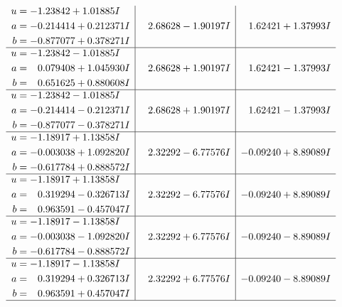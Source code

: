 \documentclass[1p]{elsarticle_modified}
\theoremstyle{definition}
\begin{document}
$$\begin{array}{c|c|c}
\begin{aligned}
u &= -1.23842 + 1.01885 I \\
a &= -0.214414 + 0.212371 I \\
b &= -0.877077 + 0.378271 I\end{aligned}
 & \phantom{-}2.68628 - 1.90197 I & \phantom{-}1.62421 + 1.37993 I \\ \hline\begin{aligned}
u &= -1.23842 - 1.01885 I \\
a &= \phantom{-}0.079408 + 1.045930 I \\
b &= \phantom{-}0.651625 + 0.880608 I\end{aligned}
 & \phantom{-}2.68628 + 1.90197 I & \phantom{-}1.62421 - 1.37993 I \\ \hline\begin{aligned}
u &= -1.23842 - 1.01885 I \\
a &= -0.214414 - 0.212371 I \\
b &= -0.877077 - 0.378271 I\end{aligned}
 & \phantom{-}2.68628 + 1.90197 I & \phantom{-}1.62421 - 1.37993 I \\ \hline\begin{aligned}
u &= -1.18917 + 1.13858 I \\
a &= -0.003038 + 1.092820 I \\
b &= -0.617784 + 0.888572 I\end{aligned}
 & \phantom{-}2.32292 - 6.77576 I & -0.09240 + 8.89089 I \\ \hline\begin{aligned}
u &= -1.18917 + 1.13858 I \\
a &= \phantom{-}0.319294 - 0.326713 I \\
b &= \phantom{-}0.963591 - 0.457047 I\end{aligned}
 & \phantom{-}2.32292 - 6.77576 I & -0.09240 + 8.89089 I \\ \hline\begin{aligned}
u &= -1.18917 - 1.13858 I \\
a &= -0.003038 - 1.092820 I \\
b &= -0.617784 - 0.888572 I\end{aligned}
 & \phantom{-}2.32292 + 6.77576 I & -0.09240 - 8.89089 I \\ \hline\begin{aligned}
u &= -1.18917 - 1.13858 I \\
a &= \phantom{-}0.319294 + 0.326713 I \\
b &= \phantom{-}0.963591 + 0.457047 I\end{aligned}
 & \phantom{-}2.32292 + 6.77576 I & -0.09240 - 8.89089 I\\
 \hline 
 \end{array}$$\newpage\newpage\renewcommand{\arraystretch}{1}
\end{document}
